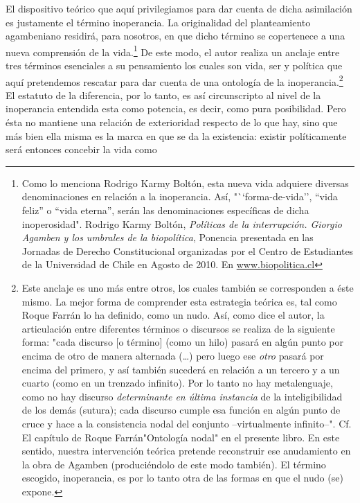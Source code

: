\documentclass{book}
\begin{document}
El dispositivo teórico que aquí privilegiamos para dar cuenta de dicha
asimilación es justamente el término inoperancia. La originalidad del
planteamiento agambeniano residirá, para nosotros, en que dicho término
se copertenece a una nueva comprensión de la vida.\footnote{Como lo
  menciona Rodrigo Karmy Boltón, esta nueva vida adquiere diversas
  denominaciones en relación a la inoperancia. Así, "``forma-de-vida'',
  ``vida feliz'' o ``vida eterna'', serán las denominaciones específicas
  de dicha inoperosidad". Rodrigo Karmy Boltón, \emph{Políticas de la
  interrupción. Giorgio Agamben y los umbrales de la biopolítica},
  Ponencia presentada en las Jornadas de Derecho Constitucional
  organizadas por el Centro de Estudiantes de la Universidad de Chile en
  Agosto de 2010. En
  \href{http://www.biopolitica.cl/}{www.biopolitica.cl}} De este modo,
el autor realiza un anclaje entre tres términos esenciales a su
pensamiento los cuales son vida, ser y política que aquí pretendemos
rescatar para dar cuenta de una ontología de la inoperancia.\footnote{Este
  anclaje es uno más entre otros, los cuales también se corresponden a
  éste mismo. La mejor forma de comprender esta estrategia teórica es,
  tal como Roque Farrán lo ha definido, como un nudo. Así, como dice el
  autor, la articulación entre diferentes términos o discursos se
  realiza de la siguiente forma: "cada discurso {[}o término{]} (como un
  hilo) pasará en algún punto por encima de otro de manera alternada
  (\dots) pero luego ese \emph{otro} pasará por encima del primero,
  y así también sucederá en relación a un tercero y a un cuarto (como en
  un trenzado infinito). Por lo tanto no hay metalenguaje, como no hay
  discurso \emph{determinante en última instancia} de la inteligibilidad
  de los demás (sutura); cada discurso cumple esa función en algún punto
  de cruce y hace a la consistencia nodal del conjunto --virtualmente
  infinito--". Cf. El capítulo de Roque Farrán"Ontología nodal" en el
  presente libro. En este sentido, nuestra intervención teórica pretende
  reconstruir ese anudamiento en la obra de Agamben (produciéndolo de
  este modo también). El término escogido, inoperancia, es por lo tanto
  otra de las formas en que el nudo (se) expone.} El estatuto de la
diferencia, por lo tanto, es así circunscripto al nivel de la
inoperancia entendida esta como potencia, es decir, como pura
posibilidad. Pero ésta no mantiene una relación de exterioridad respecto
de lo que hay, sino que más bien ella misma es la marca en que se da la
existencia: existir políticamente será entonces concebir la vida como
\end{document}

